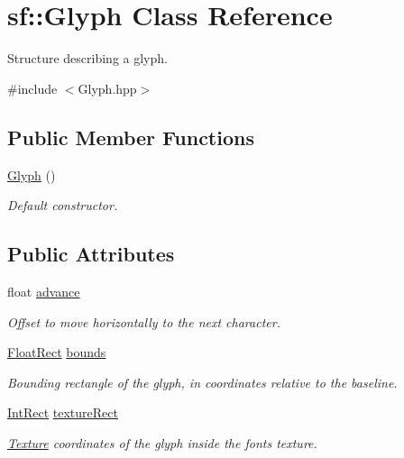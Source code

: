 \hypertarget{classsf_1_1_glyph}{}\section{sf\+:\+:Glyph Class Reference}
\label{classsf_1_1_glyph}


Structure describing a glyph.  




{\ttfamily \#include $<$Glyph.\+hpp$>$}

\subsection*{Public Member Functions}
\begin{DoxyCompactItemize}
\item 
\mbox{\hyperlink{classsf_1_1_glyph_ab15cfc37eb7b40a94b3b3aedf934010b}{Glyph}} ()
\begin{DoxyCompactList}\small\item\em Default constructor. \end{DoxyCompactList}\end{DoxyCompactItemize}
\subsection*{Public Attributes}
\begin{DoxyCompactItemize}
\item 
\mbox{\label{classsf_1_1_glyph_aeac19b97ec11409147191606b784deda}} 
float \mbox{\hyperlink{classsf_1_1_glyph_aeac19b97ec11409147191606b784deda}{advance}}
\begin{DoxyCompactList}\small\item\em Offset to move horizontally to the next character. \end{DoxyCompactList}\item 
\mbox{\label{classsf_1_1_glyph_a6f3c892093167914adc31e52e5923f4b}} 
\mbox{\hyperlink{classsf_1_1_rect}{Float\+Rect}} \mbox{\hyperlink{classsf_1_1_glyph_a6f3c892093167914adc31e52e5923f4b}{bounds}}
\begin{DoxyCompactList}\small\item\em Bounding rectangle of the glyph, in coordinates relative to the baseline. \end{DoxyCompactList}\item 
\mbox{\label{classsf_1_1_glyph_a0d502d326449f8c49011ed91d2805f5b}} 
\mbox{\hyperlink{classsf_1_1_rect}{Int\+Rect}} \mbox{\hyperlink{classsf_1_1_glyph_a0d502d326449f8c49011ed91d2805f5b}{texture\+Rect}}
\begin{DoxyCompactList}\small\item\em \mbox{\hyperlink{classsf_1_1_texture}{Texture}} coordinates of the glyph inside the font\textquotesingle{}s texture. \end{DoxyCompactList}\end{DoxyCompactItemize}


